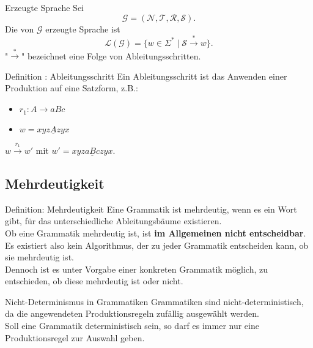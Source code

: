 \documentclass[]{beamer}
\begin{document}
\begin{frame}[<+->][squeeze]{}
  \begin{block}{Erzeugte Sprache}
    Sei 
    \[\mathcal{G = (N, T, R, S)}.\]
    Die von $\mathcal{G}$ erzeugte Sprache ist
    \[\mathcal{L(G)} = \{w \in \Sigma^* \;|\; \mathcal{S} \overset{*}{\rightarrow} w\}.\]
    "$\overset{*}{\rightarrow}$" bezeichnet eine Folge von Ableitungsschritten.
  \end{block}
  
  \begin{block}{Definition : Ableitungsschritt}
    Ein Ableitungsschritt ist das Anwenden einer Produktion auf eine Satzform, z.B.:
    \begin{itemize}
      \item<2-> $r_1 : A \rightarrow aBc$
      \item<2-> $w = xyz \underline{A} zyx$
    \end{itemize}
    $w \overset{r_1}{\rightarrow} w'$ mit $w' = xyz\underline{aBc}zyx$.
  \end{block}
\end{frame}


\subsection{Mehrdeutigkeit}
\begin{frame}[squeeze]{}
  \begin{block}{Definition: Mehrdeutigkeit}
    Eine Grammatik ist mehrdeutig, wenn es ein Wort gibt, für das unterschiedliche Ableitungsbäume existieren. \\
    \vspace*{0.5em}
    Ob eine Grammatik mehrdeutig ist, ist \textbf{im Allgemeinen nicht entscheidbar}. Es existiert also kein Algorithmus, der zu jeder Grammatik entscheiden kann, ob sie mehrdeutig ist. \\
    \vspace*{0.5em}
    Dennoch ist es unter Vorgabe einer konkreten Grammatik möglich, zu entschieden, ob diese mehrdeutig ist oder nicht.
  \end{block}
  
  \pause
  
  \begin{block}{Nicht-Determinismus in Grammatiken}
    Grammatiken sind nicht-deterministisch, da die angewendeten Produktionsregeln zufällig ausgewählt werden. \\
    \vspace*{0.5em}
    Soll eine Grammatik deterministisch sein, so darf es immer nur eine Produktionsregel zur Auswahl geben.
  \end{block}
\end{frame}
\end{document}
